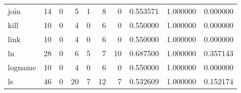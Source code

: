 \begin{longtable}{lrrrrrrrrr}
join      &                                       14 &                                                  0 &                                                  5 &                                                  1 &                                                  8 &                                                  0 &                                           0.553571 &                               1.000000 &                             0.000000 \\
kill      &                                       10 &                                                  0 &                                                  4 &                                                  0 &                                                  6 &                                                  0 &                                           0.550000 &                               1.000000 &                             0.000000 \\
link      &                                       10 &                                                  0 &                                                  4 &                                                  0 &                                                  6 &                                                  0 &                                           0.550000 &                               1.000000 &                             0.000000 \\
ln        &                                       28 &                                                  0 &                                                  6 &                                                  5 &                                                  7 &                                                 10 &                                           0.687500 &                               1.000000 &                             0.357143 \\
logname   &                                       10 &                                                  0 &                                                  4 &                                                  0 &                                                  6 &                                                  0 &                                           0.550000 &                               1.000000 &                             0.000000 \\
ls        &                                       46 &                                                  0 &                                                 20 &                                                  7 &                                                 12 &                                                  7 &                                           0.532609 &                               1.000000 &                             0.152174 \\

\end{longtable}
